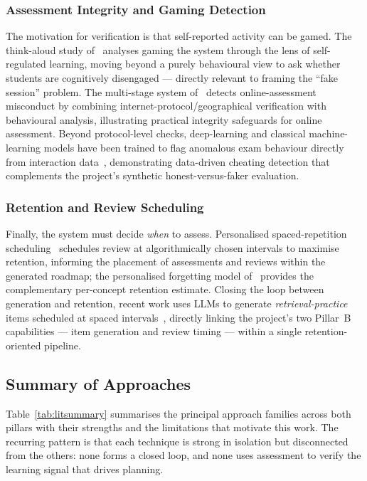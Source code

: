 \documentclass[12pt]{report}
\begin{document}
\subsubsection{Assessment Integrity and Gaming Detection}
The motivation for verification is that self-reported activity can be gamed. The
think-aloud study of~\cite{gaming2026} analyses gaming the system through the lens of
self-regulated learning, moving beyond a purely behavioural view to ask whether students
are cognitively disengaged --- directly relevant to framing the ``fake session'' problem.
The multi-stage system of~\cite{integrity2024} detects online-assessment misconduct by
combining internet-protocol/geographical verification with behavioural analysis,
illustrating practical integrity safeguards for online assessment. Beyond protocol-level
checks, deep-learning and classical machine-learning models have been trained to flag
anomalous exam behaviour directly from interaction data~\cite{erdem2025}, demonstrating
data-driven cheating detection that complements the project's synthetic
honest-versus-faker evaluation.

\subsubsection{Retention and Review Scheduling}
Finally, the system must decide \emph{when} to assess. Personalised spaced-repetition
scheduling~\cite{spaced2025} schedules review at algorithmically chosen intervals to
maximise retention, informing the placement of assessments and reviews within the
generated roadmap; the personalised forgetting model of~\cite{conceptkt2026} provides the
complementary per-concept retention estimate. Closing the loop between generation and
retention, recent work uses LLMs to generate \emph{retrieval-practice} items scheduled at
spaced intervals~\cite{retrieval2025}, directly linking the project's two Pillar~B
capabilities --- item generation and review timing --- within a single retention-oriented
pipeline.

\subsection{Summary of Approaches}
Table~\ref{tab:litsummary} summarises the principal approach families across both pillars with
their strengths and the limitations that motivate this work. The recurring pattern is that
each technique is strong in isolation but disconnected from the others: none forms a
closed loop, and none uses assessment to verify the learning signal that drives planning.
\end{document}
